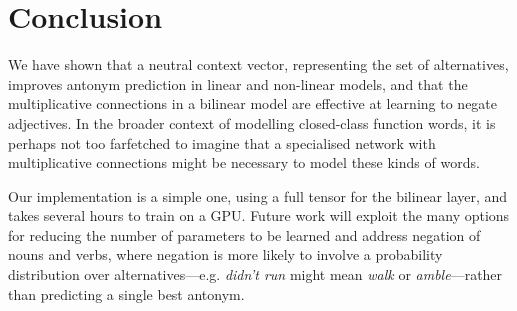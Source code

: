 \documentclass[11pt]{article}
\begin{document}
\section{Conclusion}

We have shown that a neutral context vector, representing the set of alternatives, improves antonym prediction in linear and non-linear models, and that the multiplicative connections in a bilinear model are effective at learning to negate adjectives. In the broader context of modelling closed-class function words, it is perhaps not too farfetched to imagine that a specialised network with multiplicative connections might be necessary to model these kinds of words.

Our implementation is a simple one, using a full tensor for the bilinear layer, and takes several hours to train on a GPU. Future work will exploit the many options for reducing the number of parameters to be learned \citep{alain:13} and address negation of nouns and verbs, where negation is more likely to involve a probability distribution over alternatives---e.g. {\it didn't run} might mean {\it walk} or {\it amble}---rather than predicting a single best antonym.



% 
\end{document}
